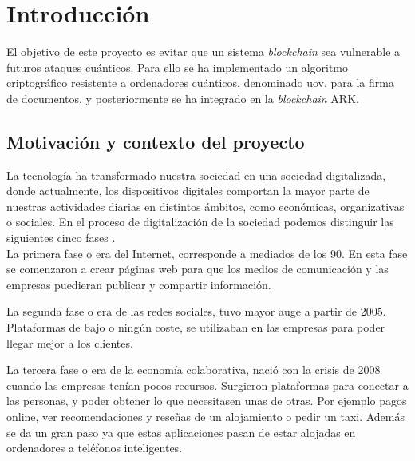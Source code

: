 \chapter{Introducción}

El objetivo de este proyecto es evitar que un sistema \textit{blockchain} sea vulnerable a futuros ataques cuánticos. Para ello se ha implementado un algoritmo criptográfico resistente a ordenadores cuánticos, denominado \acrshort{uov}, para la firma de documentos, y posteriormente se ha integrado en la \textit{blockchain} ARK.

\section{Motivación y contexto del proyecto}
\label{sec:intro:motivacion} %


La tecnología ha transformado nuestra sociedad en una sociedad digitalizada, donde actualmente, los dispositivos digitales comportan la mayor parte de nuestras actividades diarias en distintos ámbitos, como económicas, organizativas o sociales. En el proceso de digitalización de la sociedad podemos distinguir las siguientes cinco fases \cite{fases-digitalizacion}.\\

La primera fase o era del Internet, corresponde a mediados de los 90. En esta fase se comenzaron a crear páginas web para que los medios de comunicación y las empresas puedieran publicar y compartir información.

La segunda fase o era de las redes sociales, tuvo mayor auge a partir de 2005. Plataformas de bajo o ningún coste, se utilizaban en las empresas para poder llegar mejor a los clientes.

La tercera fase o era de la economía colaborativa, nació con la crisis de  2008 cuando las empresas tenían pocos recursos. Surgieron plataformas para conectar a las personas, y poder obtener lo que necesitasen unas de otras. Por ejemplo pagos online, ver recomendaciones y reseñas de un alojamiento o pedir un taxi. Además se da un gran paso ya que estas aplicaciones pasan de estar  alojadas en ordenadores a teléfonos inteligentes.


